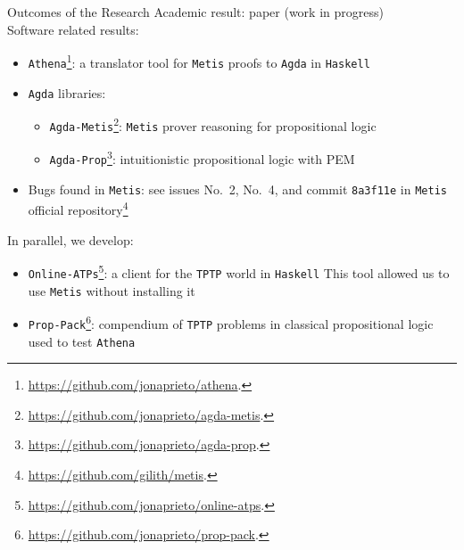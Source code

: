\documentclass[10pt, xetex, hyperref={pdfpagelabels=false}]{beamer}
\newcommand{\name}[1]{\texttt{#1}\xspace}
\newcommand{\prg}[1]{\texttt{#1}\xspace}
\newcommand{\Agda}{\prg{Agda}}
\newcommand{\Athena}{\prg{Athena}}
\newcommand{\Metis}{\prg{Metis}}
\newcommand{\len}[1]{\texttt{#1}\xspace}
\newcommand{\Haskell}{\len{Haskell}}
\newcommand{\TPTP}{\len{TPTP}}
\begin{document}
\begin{frame}[label=contributions]{Outcomes of the Research}
Academic result: paper (work in progress)\\
Software related results:
\begin{itemize}
\item \Athena\footnote{\url{https://github.com/jonaprieto/athena}.}: a translator tool for \Metis proofs to \Agda in \Haskell
\item \Agda libraries:
\begin{itemize}
  \item \texttt{Agda-Metis}\footnote{\url{https://github.com/jonaprieto/agda-metis}.}: \Metis prover reasoning for propositional logic
  \item \texttt{Agda-Prop}\footnote{\url{https://github.com/jonaprieto/agda-prop}.}: intuitionistic propositional logic with PEM
\end{itemize}
\item Bugs found in \Metis: see issues No.~2, No.~4, and commit
\name{8a3f11e} in \Metis official
repository\footnote{\url{https://github.com/gilith/metis}.}
\end{itemize}

In parallel, we develop:
\begin{itemize}
\item \name{Online-ATPs}\footnote{\url{https://github.com/jonaprieto/online-atps}.}: a client for the \TPTP world in \Haskell
This tool allowed us to use \Metis without installing it
\item \name{Prop-Pack}\footnote{\url{https://github.com/jonaprieto/prop-pack}.}: compendium of \TPTP problems in classical propositional logic used to test \Athena
\end{itemize}
\end{frame}

\end{document}
